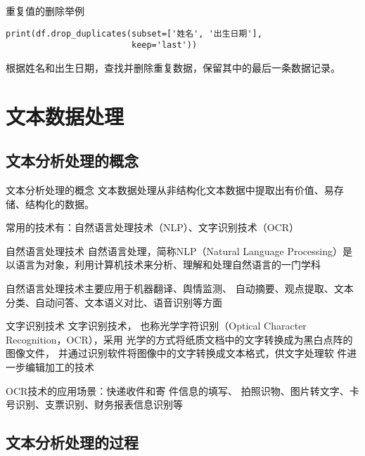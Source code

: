 \documentclass[t]{beamer}
\begin{document}
\begin{frame}[fragile]{重复值的删除举例}
\begin{lstlisting}
print(df.drop_duplicates(subset=['姓名', '出生日期'],
                         keep='last'))
\end{lstlisting}
根据姓名和出生日期，查找并删除重复数据，保留其中的最后一条数据记录。
    
\end{frame}


\section{文本数据处理}

\subsection{文本分析处理的概念}
\begin{frame}[fragile]{文本分析处理的概念}
文本数据处理从非结构化文本数据中提取出有价值、易存储、结构化的数据。

常用的技术有：自然语言处理技术（NLP）、文字识别技术（OCR）
\end{frame}
    


\begin{frame}[fragile]{自然语言处理技术}
自然语言处理，简称NLP（Natural Language Processing）是以语言为对象，利用计算机技术来分析、理解和处理自然语言的一门学科

自然语言处理技术主要应用于机器翻译、舆情监测、
自动摘要、观点提取、文本分类、自动问答、文本语义对比、语音识别等方面
\end{frame}

\begin{frame}[fragile]{文字识别技术}
文字识别技术，
也称光学字符识别（Optical Character Recognition，OCR），采用
光学的方式将纸质文档中的文字转换成为黑白点阵的图像文件，
并通过识别软件将图像中的文字转换成文本格式，供文字处理软
件进一步编辑加工的技术

OCR技术的应用场景：快递收件和寄
件信息的填写、
拍照识物、图片转文字、卡号识别、支票识别、财务报表信息识别等
\end{frame}

\subsection{文本分析处理的过程}
\end{document}
